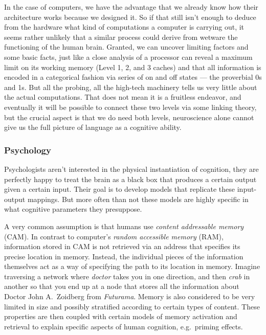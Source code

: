 In the case of computers, we have the advantage that we already know how their architecture works because we designed it.
So if that still isn't enough to deduce from the hardware what kind of computations a computer is carrying out, it seems rather unlikely that a similar process could derive from wetware the functioning of the human brain.
Granted, we can uncover limiting factors and some basic facts, just like a close analysis of a processor can reveal a maximum limit on its working memory (Level 1, 2, and 3 caches) and that all information is encoded in a categorical fashion via series of on and off states --- the proverbial 0s and 1s.
But all the probing, all the high-tech machinery tells us very little about the actual computations.
That does not mean it is a fruitless endeavor, and eventually it will be possible to connect these two levels via some linking theory, but the crucial aspect is that we do need both levels, neuroscience alone cannot give us the full picture of language as a cognitive ability.


\subsubsection{Psychology}

Psychologists aren't interested in the physical instantiation of cognition, they are perfectly happy to treat the brain as a black box that produces a certain output given a certain input.
Their goal is to develop models that replicate these input-output mappings.
But more often than not these models are highly specific in what cognitive parameters they presuppose.

A very common assumption is that humans use \emph{content addressable memory} (CAM).
In contrast to computer's \emph{random accessible memory} (RAM), information stored in CAM is not retrieved via an address that specifies its precise location in memory.
Instead, the individual pieces of the information themselves act as a way of specifying the path to its location in memory.
Imagine traversing a network where \emph{doctor} takes you in one direction, and then \emph{crab} in another so that you end up at a node that stores all the information about Doctor John A.\ Zoidberg from \emph{Futurama}.
Memory is also considered to be very limited in size and possibly stratified according to certain types of content.
These properties are then coupled with certain models of memory activation and retrieval to explain specific aspects of human cognition, e.g.\ priming effects.

